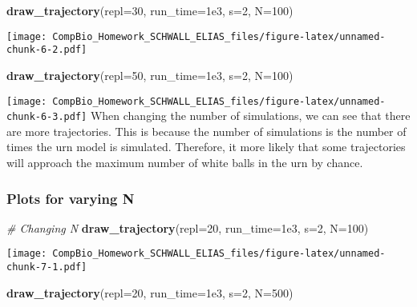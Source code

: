 \documentclass[
]{article}
\newenvironment{Shaded}{\begin{snugshade}}{\end{snugshade}}
\newcommand{\AttributeTok}[1]{\textcolor[rgb]{0.13,0.29,0.53}{#1}}
\newcommand{\CommentTok}[1]{\textcolor[rgb]{0.56,0.35,0.01}{\textit{#1}}}
\newcommand{\DecValTok}[1]{\textcolor[rgb]{0.00,0.00,0.81}{#1}}
\newcommand{\FloatTok}[1]{\textcolor[rgb]{0.00,0.00,0.81}{#1}}
\newcommand{\FunctionTok}[1]{\textcolor[rgb]{0.13,0.29,0.53}{\textbf{#1}}}
\newcommand{\NormalTok}[1]{#1}
\begin{document}
\begin{Shaded}
\begin{Highlighting}[]
\FunctionTok{draw\_trajectory}\NormalTok{(}\AttributeTok{repl=}\DecValTok{30}\NormalTok{, }\AttributeTok{run\_time=}\FloatTok{1e3}\NormalTok{, }\AttributeTok{s=}\DecValTok{2}\NormalTok{, }\AttributeTok{N=}\DecValTok{100}\NormalTok{)}
\end{Highlighting}
\end{Shaded}

\texttt{[image: CompBio\_Homework\_SCHWALL\_ELIAS\_files/figure-latex/unnamed-chunk-6-2.pdf]}

\begin{Shaded}
\begin{Highlighting}[]
\FunctionTok{draw\_trajectory}\NormalTok{(}\AttributeTok{repl=}\DecValTok{50}\NormalTok{, }\AttributeTok{run\_time=}\FloatTok{1e3}\NormalTok{, }\AttributeTok{s=}\DecValTok{2}\NormalTok{, }\AttributeTok{N=}\DecValTok{100}\NormalTok{)}
\end{Highlighting}
\end{Shaded}

\texttt{[image: CompBio\_Homework\_SCHWALL\_ELIAS\_files/figure-latex/unnamed-chunk-6-3.pdf]}
When changing the number of simulations, we can see that there are more
trajectories. This is because the number of simulations is the number of
times the urn model is simulated. Therefore, it more likely that some
trajectories will approach the maximum number of white balls in the urn
by chance. \newpage

\hypertarget{plots-for-varying-n}{%
\subsubsection{Plots for varying N}\label{plots-for-varying-n}}

\begin{Shaded}
\begin{Highlighting}[]
\CommentTok{\# Changing N}
\FunctionTok{draw\_trajectory}\NormalTok{(}\AttributeTok{repl=}\DecValTok{20}\NormalTok{, }\AttributeTok{run\_time=}\FloatTok{1e3}\NormalTok{, }\AttributeTok{s=}\DecValTok{2}\NormalTok{, }\AttributeTok{N=}\DecValTok{100}\NormalTok{)}
\end{Highlighting}
\end{Shaded}

\texttt{[image: CompBio\_Homework\_SCHWALL\_ELIAS\_files/figure-latex/unnamed-chunk-7-1.pdf]}

\begin{Shaded}
\begin{Highlighting}[]
\FunctionTok{draw\_trajectory}\NormalTok{(}\AttributeTok{repl=}\DecValTok{20}\NormalTok{, }\AttributeTok{run\_time=}\FloatTok{1e3}\NormalTok{, }\AttributeTok{s=}\DecValTok{2}\NormalTok{, }\AttributeTok{N=}\DecValTok{500}\NormalTok{)}
\end{Highlighting}
\end{Shaded}
\end{document}
